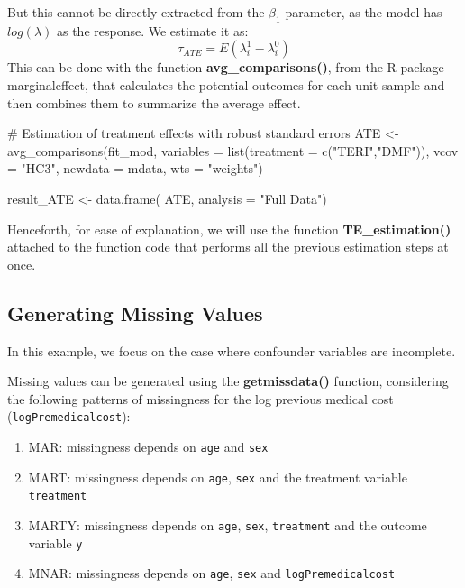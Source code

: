 \documentclass[
  letterpaper,
  DIV=11,
  numbers=noendperiod]{scrreprt}
\newenvironment{Shaded}{\begin{snugshade}}{\end{snugshade}}
\newcommand{\AttributeTok}[1]{\textcolor[rgb]{0.40,0.45,0.13}{#1}}
\newcommand{\CommentTok}[1]{\textcolor[rgb]{0.37,0.37,0.37}{#1}}
\newcommand{\FunctionTok}[1]{\textcolor[rgb]{0.28,0.35,0.67}{#1}}
\newcommand{\NormalTok}[1]{\textcolor[rgb]{0.00,0.23,0.31}{#1}}
\newcommand{\OtherTok}[1]{\textcolor[rgb]{0.00,0.23,0.31}{#1}}
\newcommand{\StringTok}[1]{\textcolor[rgb]{0.13,0.47,0.30}{#1}}
\providecommand{\tightlist}{%
  \setlength{\itemsep}{0pt}\setlength{\parskip}{0pt}}\usepackage{longtable,booktabs,array}
\begin{document}
But this cannot be directly extracted from the \(\beta_1\) parameter, as
the model has \(log(\lambda)\) as the response. We estimate it as:
\[\tau_{ATE}=E(\lambda^1_i-\lambda^0_i)\] This can be done with the
function \textbf{avg\_comparisons()}, from the R package marginaleffect,
that calculates the potential outcomes for each unit sample and then
combines them to summarize the average effect.

\begin{Shaded}
\begin{Highlighting}[]
\CommentTok{\# Estimation of treatment effects with robust standard errors}
\NormalTok{ATE }\OtherTok{\textless{}{-}} \FunctionTok{avg\_comparisons}\NormalTok{(fit\_mod, }
                       \AttributeTok{variables =} \FunctionTok{list}\NormalTok{(}\AttributeTok{treatment =} \FunctionTok{c}\NormalTok{(}\StringTok{"TERI"}\NormalTok{,}\StringTok{"DMF"}\NormalTok{)),}
                       \AttributeTok{vcov =} \StringTok{"HC3"}\NormalTok{,}
                       \AttributeTok{newdata =}\NormalTok{ mdata,}
                       \AttributeTok{wts =} \StringTok{"weights"}\NormalTok{)}

\NormalTok{result\_ATE }\OtherTok{\textless{}{-}} \FunctionTok{data.frame}\NormalTok{( ATE,}
                          \AttributeTok{analysis =} \StringTok{"Full Data"}\NormalTok{)}
\end{Highlighting}
\end{Shaded}

Henceforth, for ease of explanation, we will use the function
\textbf{TE\_estimation()} attached to the function code that performs
all the previous estimation steps at once.

\hypertarget{generating-missing-values}{%
\subsection{Generating Missing Values}\label{generating-missing-values}}

In this example, we focus on the case where confounder variables are
incomplete.

Missing values can be generated using the \textbf{getmissdata()}
function, considering the following patterns of missingness for the log
previous medical cost (\texttt{logPremedicalcost}):

\begin{enumerate}
\def\labelenumi{\arabic{enumi}.}
\tightlist
\item
  MAR: missingness depends on \texttt{age} and \texttt{sex}
\item
  MART: missingness depends on \texttt{age}, \texttt{sex} and the
  treatment variable \texttt{treatment}
\item
  MARTY: missingness depends on \texttt{age}, \texttt{sex},
  \texttt{treatment} and the outcome variable \texttt{y}
\item
  MNAR: missingness depends on \texttt{age}, \texttt{sex} and
  \texttt{logPremedicalcost}
\end{enumerate}
\end{document}
